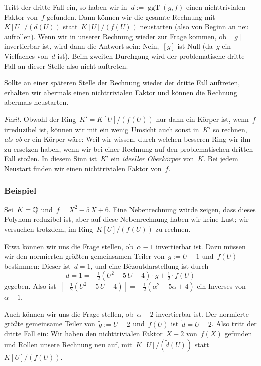 \documentclass{../../alg2/algblatt}
\begin{document}
Tritt der dritte Fall ein, so haben wir in~$d :=
\operatorname{ggT}(g,f)$ einen nichttrivialen Faktor von~$f$ gefunden. Dann
können wir die gesamte Rechnung mit~$K[U]/(d(U))$ statt~$K[U]/(f(U))$ neustarten
(also von Beginn an neu aufrollen). Wenn wir in unserer Rechnung wieder zur
Frage kommen, ob~$[g]$ invertierbar ist, wird dann die Antwort sein:
Nein,~$[g]$ ist Null (da~$g$ ein Vielfaches von~$d$ ist). Beim zweiten
Durchgang wird der problematische dritte Fall an dieser Stelle also nicht
auftreten.

Sollte an einer späteren Stelle der Rechnung wieder der dritte Fall auftreten,
erhalten wir abermals einen nichttrivialen Faktor und können die Rechnung
abermals neustarten.

\emph{Fazit.} Obwohl der Ring~$K' = K[U]/(f(U))$ nur dann ein Körper ist, wenn~$f$
irreduzibel ist, können wir mit ein wenig Umsicht auch sonst in~$K'$ so
rechnen, \emph{als ob} er ein Körper wäre: Weil wir wissen, durch welchen
besseren Ring wir ihn zu ersetzen haben, wenn wir bei einer Rechnung auf den
problematischen dritten Fall stoßen. In diesem Sinn ist~$K'$ ein \emph{ideeller
Oberkörper} von~$K$. Bei jedem Neustart finden wir einen
nichttrivialen Faktor von~$f$.


\subsubsection*{Beispiel}

Sei~$K = \mathbb{Q}$ und~$f = X^2 - 5\,X + 6$. Eine Nebenrechnung
würde zeigen, dass dieses Polynom reduzibel ist, aber auf diese Nebenrechnung
haben wir keine Lust; wir versuchen trotzdem, im Ring~$K[U]/(f(U))$ zu rechnen.

Etwa können wir uns die Frage stellen, ob~$\alpha - 1$ invertierbar ist. Dazu
müssen wir den normierten größten gemeinsamen Teiler von~$g := U - 1$ und~$f(U)$
bestimmen: Dieser ist~$d = 1$, und eine Bézoutdarstellung ist durch
\[ d = 1 = -\tfrac{1}{2}(U^2 - 5\,U + 4) \cdot g + \tfrac{1}{2} \cdot f(U) \]
gegeben. Also ist~$[-\tfrac{1}{2}(U^2-5\,U+4)] =
-\tfrac{1}{2}(\alpha^2-5\alpha+4)$ ein Inverses von~$\alpha - 1$.

Auch können wir uns die Frage stellen, ob~$\alpha - 2$ invertierbar ist. Der
normierte größte gemeinsame Teiler von~$\tilde g := U - 2$ und~$f(U)$ ist~$\tilde
d = U-2$. Also tritt der dritte Fall ein: Wir haben den nichttrivialen
Faktor~$X-2$ von~$f(X)$ gefunden und Rollen unsere Rechnung neu auf,
mit~$K[U]/(\tilde d(U))$ statt~$K[U]/(f(U))$.
\end{document}
